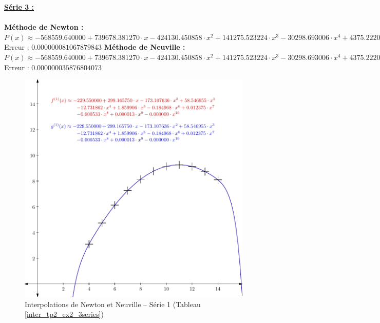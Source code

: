 \documentclass{report}
\begin{document}
	\noindent\underline{\textbf{Série 3 :}} \\ \\
	\textbf{Méthode de Newton :}\\
	$P(x) \approx -568559.640000 + 739678.381270 \cdot x- 424130.450858 \cdot x^{2}  + 141275.523224 \cdot x^{3} - 30298.693006 \cdot x^{4}  + 4375.222059 \cdot x^{5} - 431.155992 \cdot x^{6}  + 28.652640 \cdot x^{7} - 1.229803 \cdot x^{8}  + 0.030806 \cdot x^{9} - 0.000342 \cdot x^{10} $\\
	Erreur : $0.000000081067879843$
	\newline
	\newline
	\textbf{Méthode de Neuville :}\\
	$P(x) \approx -568559.640000 + 739678.381270 \cdot x- 424130.450858 \cdot x^{2}  + 141275.523224 \cdot x^{3} - 30298.693006 \cdot x^{4}  + 4375.222059 \cdot x^{5} - 431.155992 \cdot x^{6}  + 28.652640 \cdot x^{7} - 1.229803 \cdot x^{8}  + 0.030806 \cdot x^{9} - 0.000342 \cdot x^{10} $\\
	Erreur : $0.000000035876804073$
	\newpage
	\begin{figure}[h]
	  \centering
  	\includegraphics[scale=0.5]{graphiques/pdf_output/inter_tp2_ex2_1.pdf}
	  \caption{Interpolations de Newton et Neuville -- Série 1 (Tableau \ref{inter_tp2_ex2_3series})}
	\end{figure}
\end{document}
